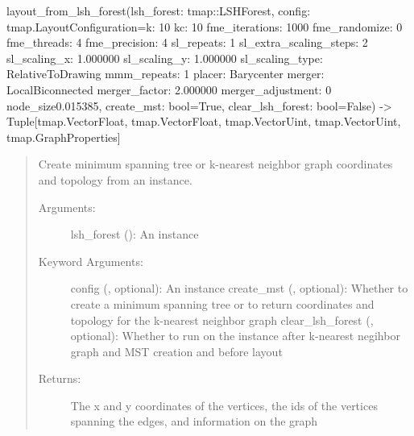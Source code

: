 \documentclass[letterpaper,10pt,english]{sphinxmanual}
\begin{document}
\begin{fulllineitems}
\label{\detokenize{documentation:tmap.layout_from_lsh_forest}}
layout\_from\_lsh\_forest(lsh\_forest: tmap::LSHForest, config: tmap.LayoutConfiguration=k: 10
kc: 10
fme\_iterations: 1000
fme\_randomize: 0
fme\_threads: 4
fme\_precision: 4
sl\_repeats: 1
sl\_extra\_scaling\_steps: 2
sl\_scaling\_x: 1.000000
sl\_scaling\_y: 1.000000
sl\_scaling\_type: RelativeToDrawing
mmm\_repeats: 1
placer: Barycenter
merger: LocalBiconnected
merger\_factor: 2.000000
merger\_adjustment: 0
node\_size0.015385, create\_mst: bool=True, clear\_lsh\_forest: bool=False) -\textgreater{} Tuple{[}tmap.VectorFloat, tmap.VectorFloat, tmap.VectorUint, tmap.VectorUint, tmap.GraphProperties{]}
\begin{quote}

Create minimum spanning tree or k-nearest neighbor graph coordinates and topology from an {\hyperref[\detokenize{documentation:tmap.LSHForest}]{}} instance.
\begin{description}
\item[{Arguments:}] \leavevmode
lsh\_forest ({\hyperref[\detokenize{documentation:tmap.LSHForest}]{}}): An {\hyperref[\detokenize{documentation:tmap.LSHForest}]{}} instance

\item[{Keyword Arguments:}] \leavevmode
config ({\hyperref[\detokenize{documentation:tmap.LayoutConfiguration}]{}}, optional): An {\hyperref[\detokenize{documentation:tmap.LayoutConfiguration}]{}} instance
create\_mst (, optional): Whether to create a minimum spanning tree or to return coordinates and topology for the k-nearest neighbor graph
clear\_lsh\_forest (, optional): Whether to run  on the {\hyperref[\detokenize{documentation:tmap.LSHForest}]{}} instance after k-nearest negihbor graph and MST creation and before layout

\item[{Returns:}] \leavevmode
{} The x and y coordinates of the vertices, the ids of the vertices spanning the edges, and information on the graph

\end{description}
\end{quote}

\end{fulllineitems}
\end{document}
